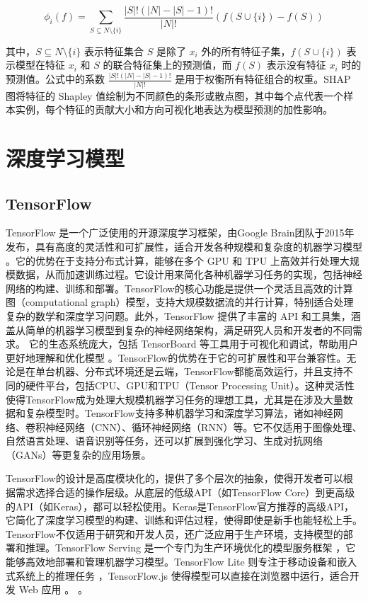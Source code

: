 \documentclass[AutoFakeBold]{LZUThesis-PgD&PhD}
\begin{document}
	\[
	\phi_i(f) = \sum_{S \subseteq N \setminus \{i\}} \frac{|S|! (|N| - |S| - 1)!}{|N|!} \left( f(S \cup \{i\}) - f(S) \right)
	\]
	
	其中，\( S \subseteq N \setminus \{i\} \) 表示特征集合 \( S \) 是除了 \( x_i \) 外的所有特征子集，\( f(S \cup \{i\}) \) 表示模型在特征 \( x_i \) 和 \( S \) 的联合特征集上的预测值，而 \( f(S) \) 表示没有特征 \( x_i \) 时的预测值。公式中的系数 \( \frac{|S|! (|N| - |S| - 1)!}{|N|!} \) 是用于权衡所有特征组合的权重。SHAP 图将特征的 Shapley 值绘制为不同颜色的条形或散点图，其中每个点代表一个样本实例，每个特征的贡献大小和方向可视化地表达为模型预测的加性影响。
	
	
	\section{深度学习模型}
	
	
	\subsection{TensorFlow}
	
	TensorFlow 是一个广泛使用的开源深度学习框架，由Google Brain团队于2015年发布，具有高度的灵活性和可扩展性，适合开发各种规模和复杂度的机器学习模型 \cite{tensorflow2015-whitepaper}。它的优势在于支持分布式计算，能够在多个 GPU 和 TPU 上高效并行处理大规模数据，从而加速训练过程。它设计用来简化各种机器学习任务的实现，包括神经网络的构建、训练和部署。TensorFlow的核心功能是提供一个灵活且高效的计算图（computational graph）模型，支持大规模数据流的并行计算，特别适合处理复杂的数学和深度学习问题。此外，TensorFlow 提供了丰富的 API 和工具集，涵盖从简单的机器学习模型到复杂的神经网络架构，满足研究人员和开发者的不同需求。
	它的生态系统庞大，包括 TensorBoard 等工具用于可视化和调试，帮助用户更好地理解和优化模型 \cite{tensorboard}。TensorFlow的优势在于它的可扩展性和平台兼容性。无论是在单台机器、分布式环境还是云端，TensorFlow都能高效运行，并且支持不同的硬件平台，包括CPU、GPU和TPU（Tensor Processing Unit）。这种灵活性使得TensorFlow成为处理大规模机器学习任务的理想工具，尤其是在涉及大量数据和复杂模型时。TensorFlow支持多种机器学习和深度学习算法，诸如神经网络、卷积神经网络（CNN）、循环神经网络（RNN）等。它不仅适用于图像处理、自然语言处理、语音识别等任务，还可以扩展到强化学习、生成对抗网络（GANs）等更复杂的应用场景。
	
	TensorFlow的设计是高度模块化的，提供了多个层次的抽象，使得开发者可以根据需求选择合适的操作层级。从底层的低级API（如TensorFlow Core）到更高级的API（如Keras），都可以轻松使用。Keras是TensorFlow官方推荐的高级API，它简化了深度学习模型的构建、训练和评估过程，使得即使是新手也能轻松上手。TensorFlow不仅适用于研究和开发人员，还广泛应用于生产环境，支持模型的部署和推理。TensorFlow Serving 是一个专门为生产环境优化的模型服务框架 \cite{tensorflow_serving}，它能够高效地部署和管理机器学习模型。TensorFlow Lite 则专注于移动设备和嵌入式系统上的推理任务 \cite{tensorflowlite}，TensorFlow.js 使得模型可以直接在浏览器中运行，适合开发 Web 应用 \cite{tensorflowjs}。
	。
	
\end{document}
